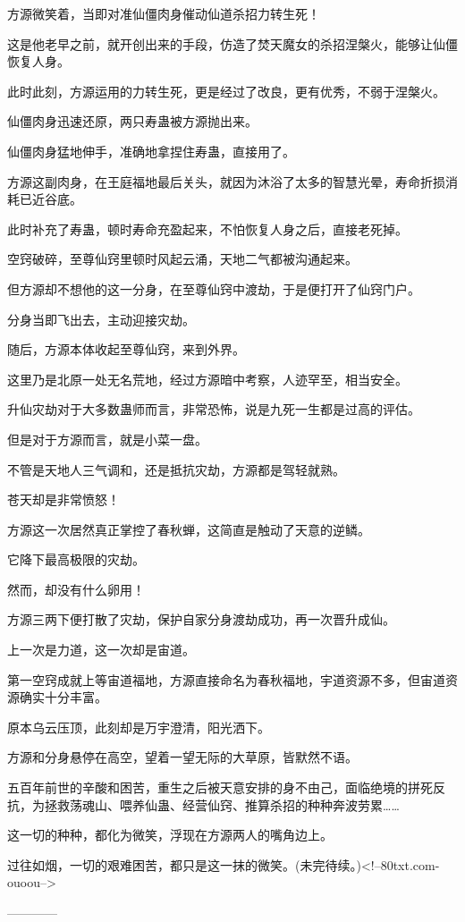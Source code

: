 \begin{this_body}
方源微笑着，当即对准仙僵肉身催动仙道杀招力转生死！

这是他老早之前，就开创出来的手段，仿造了焚天魔女的杀招涅槃火，能够让仙僵恢复人身。

此时此刻，方源运用的力转生死，更是经过了改良，更有优秀，不弱于涅槃火。

仙僵肉身迅速还原，两只寿蛊被方源抛出来。

仙僵肉身猛地伸手，准确地拿捏住寿蛊，直接用了。

方源这副肉身，在王庭福地最后关头，就因为沐浴了太多的智慧光晕，寿命折损消耗已近谷底。

此时补充了寿蛊，顿时寿命充盈起来，不怕恢复人身之后，直接老死掉。

空窍破碎，至尊仙窍里顿时风起云涌，天地二气都被沟通起来。

但方源却不想他的这一分身，在至尊仙窍中渡劫，于是便打开了仙窍门户。

分身当即飞出去，主动迎接灾劫。

随后，方源本体收起至尊仙窍，来到外界。

这里乃是北原一处无名荒地，经过方源暗中考察，人迹罕至，相当安全。

升仙灾劫对于大多数蛊师而言，非常恐怖，说是九死一生都是过高的评估。

但是对于方源而言，就是小菜一盘。

不管是天地人三气调和，还是抵抗灾劫，方源都是驾轻就熟。

苍天却是非常愤怒！

方源这一次居然真正掌控了春秋蝉，这简直是触动了天意的逆鳞。

它降下最高极限的灾劫。

然而，却没有什么卵用！

方源三两下便打散了灾劫，保护自家分身渡劫成功，再一次晋升成仙。

上一次是力道，这一次却是宙道。

第一空窍成就上等宙道福地，方源直接命名为春秋福地，宇道资源不多，但宙道资源确实十分丰富。

原本乌云压顶，此刻却是万宇澄清，阳光洒下。

方源和分身悬停在高空，望着一望无际的大草原，皆默然不语。

五百年前世的辛酸和困苦，重生之后被天意安排的身不由己，面临绝境的拼死反抗，为拯救荡魂山、喂养仙蛊、经营仙窍、推算杀招的种种奔波劳累……

这一切的种种，都化为微笑，浮现在方源两人的嘴角边上。

过往如烟，一切的艰难困苦，都只是这一抹的微笑。(未完待续。)<!--80txt.com-ouoou-->

------------

\end{this_body}

